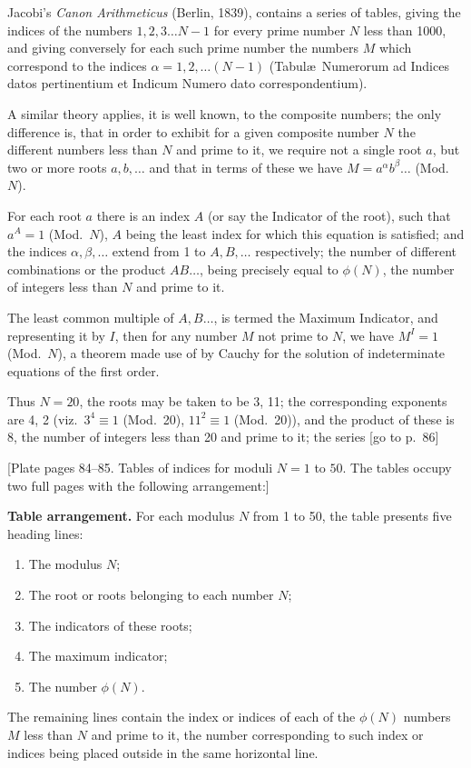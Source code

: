 \documentclass[11pt,a4paper]{article}
\theoremstyle{definition}
\begin{document}
Jacobi's \textit{Canon Arithmeticus} (Berlin, 1839), contains a series of tables, giving the indices of the numbers $1, 2, 3 \dots N-1$ for every prime number $N$ less than 1000, and giving conversely for each such prime number the numbers $M$ which correspond to the indices $\alpha = 1, 2, \dots (N-1)$ (Tabul\ae\ Numerorum ad Indices datos pertinentium et Indicum Numero dato correspondentium).

A similar theory applies, it is well known, to the composite numbers; the only difference is, that in order to exhibit for a given composite number $N$ the different numbers less than $N$ and prime to it, we require not a single root $a$, but two or more roots $a, b, \dots$ and that in terms of these we have $M = a^\alpha b^\beta \dots$ (Mod.\ $N$).

For each root $a$ there is an index $A$ (or say the Indicator of the root), such that $a^A = 1$ (Mod.\ $N$), $A$ being the least index for which this equation is satisfied; and the indices $\alpha, \beta, \dots$ extend from 1 to $A, B, \dots$ respectively; the number of different combinations or the product $AB\dots$, being precisely equal to $\phi(N)$, the number of integers less than $N$ and prime to it.

The least common multiple of $A, B\dots$, is termed the Maximum Indicator, and representing it by $I$, then for any number $M$ not prime to $N$, we have $M^I = 1$ (Mod.\ $N$), a theorem made use of by Cauchy for the solution of indeterminate equations of the first order.

Thus $N = 20$, the roots may be taken to be 3, 11; the corresponding exponents are 4, 2 (viz.\ $3^4 \equiv 1$ (Mod.\ 20), $11^2 \equiv 1$ (Mod.\ 20)), and the product of these is 8, the number of integers less than 20 and prime to it; the series [go to p.~86]

\newpage

[Plate pages 84--85. Tables of indices for moduli $N = 1$ to $50$. The tables occupy two full pages with the following arrangement:]

\bigskip

\noindent\textbf{Table arrangement.} For each modulus $N$ from 1 to 50, the table presents five heading lines:
\begin{enumerate}[label=\arabic*.]
\item The modulus $N$;
\item The root or roots belonging to each number $N$;
\item The indicators of these roots;
\item The maximum indicator;
\item The number $\phi(N)$.
\end{enumerate}
The remaining lines contain the index or indices of each of the $\phi(N)$ numbers $M$ less than $N$ and prime to it, the number corresponding to such index or indices being placed outside in the same horizontal line.
\end{document}
